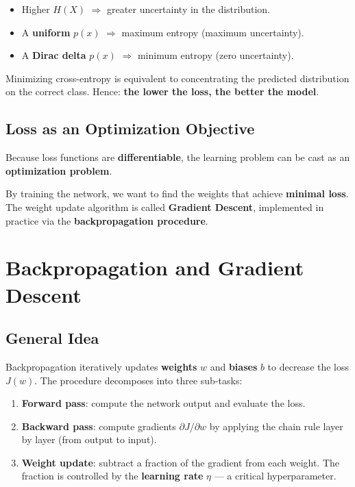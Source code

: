 \documentclass[11pt,a4paper]{article}
\theoremstyle{definition}
\theoremstyle{plain}
\theoremstyle{remark}
\begin{document}
\begin{itemize}
    \item Higher $H(X)$ $\Rightarrow$ greater uncertainty in the distribution.
    \item A \textbf{uniform} $p(x)$ $\Rightarrow$ maximum entropy (maximum uncertainty).
    \item A \textbf{Dirac delta} $p(x)$ $\Rightarrow$ minimum entropy (zero uncertainty).
\end{itemize}

Minimizing cross-entropy is equivalent to concentrating the predicted distribution on the correct class. Hence: \textbf{the lower the loss, the better the model}.

\subsection{Loss as an Optimization Objective}

Because loss functions are \textbf{differentiable}, the learning problem can be cast as an \textbf{optimization problem}.

\begin{tcolorbox}[colback=blue!5!white,colframe=blue!75!black,title=\textbf{Key Insight}]
By training the network, we want to find the weights that achieve \textbf{minimal loss}. The weight update algorithm is called \textbf{Gradient Descent}, implemented in practice via the \textbf{backpropagation procedure}.
\end{tcolorbox}


\section{Backpropagation and Gradient Descent}

\subsection{General Idea}

Backpropagation iteratively updates \textbf{weights} $w$ and \textbf{biases} $b$ to decrease the loss $J(w)$. The procedure decomposes into three sub-tasks:
\begin{enumerate}
    \item \textbf{Forward pass}: compute the network output and evaluate the loss.
    \item \textbf{Backward pass}: compute gradients $\partial J/\partial w$ by applying the chain rule layer by layer (from output to input).
    \item \textbf{Weight update}: subtract a fraction of the gradient from each weight. The fraction is controlled by the \textbf{learning rate} $\eta$ --- a critical hyperparameter.
\end{enumerate}
\end{document}
